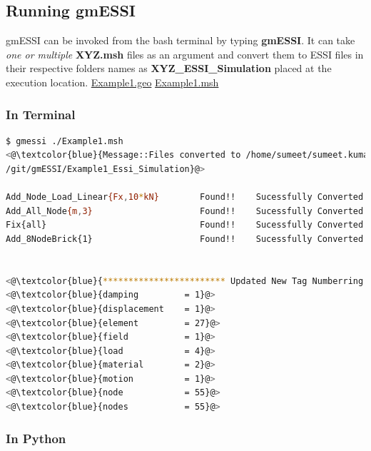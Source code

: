 \documentclass[11pt]{article}
\begin{document}
\subsection {Running gmESSI}

gmESSI  can  be invoked from the bash terminal by typing \textbf{gmESSI}. It
can take  \textit{one or multiple} \textbf{XYZ.msh} files as an argument and
convert them to ESSI files in their respective folders names as
\textbf{XYZ\_ESSI\_Simulation} placed at the execution location.
\href{http://beta.sumeetsinha.in/gmESSI/Examples/Example1/Example1.geo}{
Example1.geo}
\href{http://beta.sumeetsinha.in/gmESSI/Examples/Example1/Example1.msh}{
Example1.msh }


\subsubsection{In Terminal}

\begin{lstlisting}[language=bash,backgroundcolor=\color{grayish}]
$ gmessi ./Example1.msh
<@\textcolor{blue}{Message::Files converted to /home/sumeet/sumeet.kumar507@gmail.com \newline{}
/git/gmESSI/Example1_Essi_Simulation}@>  

Add_Node_Load_Linear{Fx,10*kN}        Found!!    Sucessfully Converted
Add_All_Node{m,3}                     Found!!    Sucessfully Converted
Fix{all}                              Found!!    Sucessfully Converted
Add_8NodeBrick{1}                     Found!!    Sucessfully Converted


<@\textcolor{blue}{************************ Updated New Tag Numberring *********************}@>
<@\textcolor{blue}{damping         = 1}@>
<@\textcolor{blue}{displacement    = 1}@>
<@\textcolor{blue}{element         = 27}@>
<@\textcolor{blue}{field           = 1}@>
<@\textcolor{blue}{load            = 4}@>
<@\textcolor{blue}{material        = 2}@>
<@\textcolor{blue}{motion          = 1}@>
<@\textcolor{blue}{node            = 55}@>
<@\textcolor{blue}{nodes           = 55}@>

\end{lstlisting}

\subsubsection{In Python}
\end{document}

